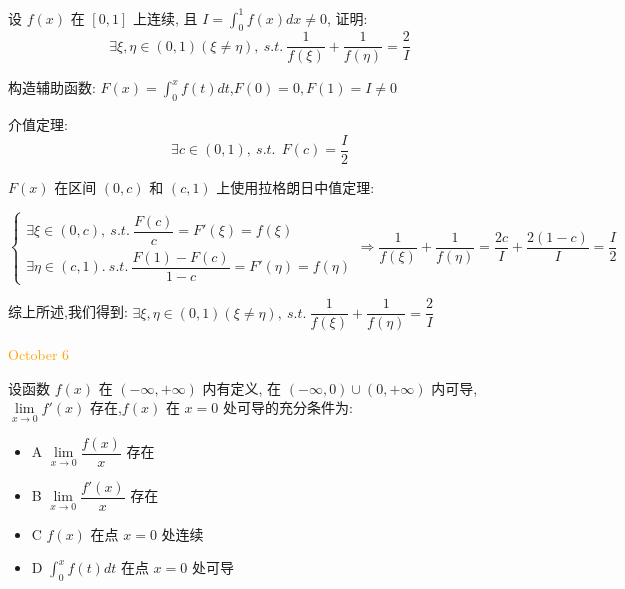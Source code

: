 \begin{example}[][Exam: 36.1.10]
	设 $f(x)$ 在 $[0,1]$ 上连续, 且 $\displaystyle{I=\int_{0}^{1}f(x)dx\neq 0}$, 证明:
$$\exists \xi,\eta\in(0,1)(\xi\neq \eta),\ s.t.\ \dfrac{1}{f(\xi)}+\dfrac{1}{f(\eta)}=\dfrac{2}{I}$$
\end{example}

\begin{solution}

	构造辅助函数: $\displaystyle{F(x)=\int_{0}^{x}f(t)dt}$,$F(0)=0,F(1)=I\neq 0$
	
	介值定理:  
	$$\exists c\in(0,1),\ s.t.\ \ F(c)=\dfrac{I}{2}$$
	
	$F(x)$ 在区间 $(0,c)$ 和 $(c,1)$ 上使用拉格朗日中值定理:  
	
	$$\begin{cases}
		\exists \xi  \in (0,c),\ s.t.\  \dfrac{F(c)}{c} = F'(\xi) = f(\xi) \\
		\exists \eta \in (c,1).\ s.t.\  \dfrac{F(1)-F(c)}{1-c} = F'(\eta) = f(\eta)
	\end{cases} \Rightarrow 
	\dfrac{1}{f(\xi)} + \dfrac{1}{f(\eta)} = \dfrac{2c}{I} + \dfrac{2(1-c)}{I} = \dfrac{I}{2}$$
	
	综上所述,我们得到: $\exists \xi,\eta\in(0,1)(\xi\neq \eta),\ s.t.\ \dfrac{1}{f(\xi)}+\dfrac{1}{f(\eta)}=\dfrac{2}{I}$
\end{solution}


\textcolor{orange}{October 6}

\begin{example}[][Exam: 36.1.11]
	设函数 $f(x)$ 在 $(-\infty,+\infty)$ 内有定义, 在 $(-\infty,0)\cup(0,+\infty)$ 内可导,
$\lim\limits_{x\to 0}f'(x)$ 存在,$f(x)$ 在 $x=0$ 处可导的充分条件为:  
\begin{itemize}
	\item A $\lim\limits_{x\to 0}\dfrac{f(x)}{x}$ 存在
	\item B $\lim\limits_{x\to 0}\dfrac{f'(x)}{x}$ 存在
	\item C $f(x)$ 在点 $x=0$ 处连续
	\item D $\int_{0}^{x}f(t)dt$ 在点 $x=0$ 处可导
\end{itemize}
\end{example}

